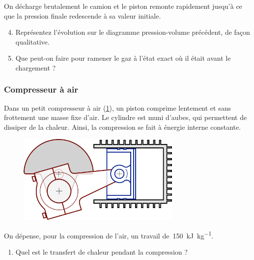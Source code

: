	On décharge brutalement le camion et le piston remonte rapidement jusqu’à ce que la pression finale redescende à sa valeur initiale.
	
	\begin{enumerate}
		\setcounter{enumi}{3}
		\item Représentez l’évolution sur le diagramme pression-volume précédent, de façon qualitative.
		\item Que peut-on faire pour ramener le gaz à l’état exact où il était avant le chargement ?
	\end{enumerate}


\subsubsection{Compresseur à air}
\label{exo_compresseur_air}

	Dans un petit compresseur à air (\cref{fig_compresseur}), un piston comprime lentement et sans frottement une masse fixe d’air. Le cylindre est muni d’aubes, qui permettent de dissiper de la chaleur. Ainsi, la compression se fait à énergie interne constante.	

	\begin{figure}[h]%
	\begin{center}
		\includegraphics[width=8cm]{images/compresseur_air.png}
	\end{center}
	\label{fig_compresseur}
	\end{figure}

	On dépense, pour la compression de l’air, un travail de~\SI{150}{\kilo\joule\per\kilogram}.
		
	\begin{enumerate}
		\item Quel est le transfert de chaleur pendant la compression ?
	\end{enumerate}
	
